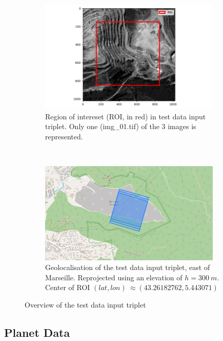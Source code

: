 \documentclass[paper=a4, fontsize=11pt, onecolumn, tikz, dvipsnames, svgnames, x11names]{article}
\begin{document}
\begin{figure}[H]
    \centering
    \begin{subfigure}[t]{0.8\textwidth}
        \centering
        \includegraphics[width = 0.95\textwidth]{ROI_testdata_triplets.png}
        \caption{Region of intereset (ROI, in red) in test data input triplet. Only one (img\_01.tif) of the 3 images is represented.}
    \end{subfigure}%
    ~
    \vfill
    ~
    \begin{subfigure}[t]{0.8\textwidth}
        \centering
        \includegraphics[width = 0.95\textwidth]{geoloc_testdata_triplets.png}
        \caption{Geolocalisation of the test data input triplet, east of Marseille. Reprojected using an elevation of $h=300~m$. Center of ROI $(lat, lon) ~\approx (43.26182762, 5.443071)$}
    \end{subfigure}%
    \caption{Overview of the test data input triplet}
    \label{fig_geoloc_testdata_triplet}
\end{figure}

\subsection{Planet Data}
\end{document}
